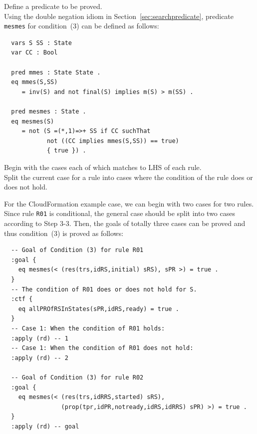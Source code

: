 \documentclass[12pt]{report}
\begin{document}
 Define a predicate to be proved.\\
Using the double negation idiom in Section~\ref{sec:searchpredicate},
predicate {\tt mesmes} for condition~(3) can be defined
as follows:
\small
\begin{verbatim}
  vars S SS : State
  var CC : Bool

  pred mmes : State State .
  eq mmes(S,SS)
     = inv(S) and not final(S) implies m(S) > m(SS) .

  pred mesmes : State .
  eq mesmes(S)
     = not (S =(*,1)=>+ SS if CC suchThat
            not ((CC implies mmes(S,SS)) == true)
            { true }) .
\end{verbatim}
\normalsize

 Begin with the cases each of which matches to
LHS of each rule. \\ 
 Split the current case for a rule into
cases where the condition of the rule does or does not hold. 

For the CloudFormation example case, we can begin with two cases for
two rules. Since rule {\tt R01} is conditional, the general case
should be split into two cases according to Step 3-3. Then, the goals
of totally three cases can be proved and thus
condition~(3) is proved as follows:
\small
\begin{verbatim}
  -- Goal of Condition (3) for rule R01
  :goal {
    eq mesmes(< (res(trs,idRS,initial) sRS), sPR >) = true .
  }
  -- The condition of R01 does or does not hold for S.
  :ctf {
    eq allPROfRSInStates(sPR,idRS,ready) = true .
  }
  -- Case 1: When the condition of R01 holds:
  :apply (rd) -- 1
  -- Case 1: When the condition of R01 does not hold:
  :apply (rd) -- 2

  -- Goal of Condition (3) for rule R02
  :goal {
    eq mesmes(< (res(trs,idRRS,started) sRS),
                (prop(tpr,idPR,notready,idRS,idRRS) sPR) >) = true .
  }
  :apply (rd) -- goal
\end{verbatim}
\normalsize

\end{document}
